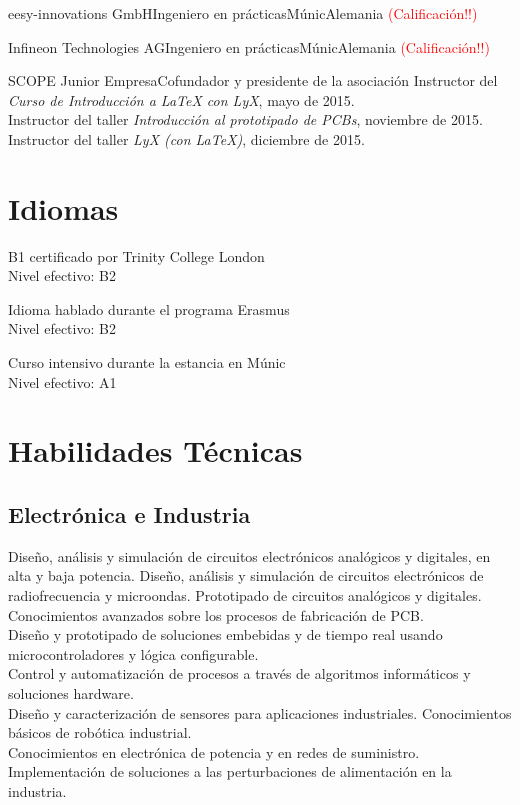 \documentclass[11pt,a4paper,sans,spanish]{moderncv}
\begin{document}
{eesy-innovations GmbH}{Ingeniero en prácticas}{Múnic}{Alemania}
{\textcolor{red}{(Calificación!!)}}

{Infineon Technologies AG}{Ingeniero en prácticas}{Múnic}{Alemania}
{\textcolor{red}{(Calificación!!)}}

{SCOPE Junior Empresa}{Cofundador y presidente de la asociación}{}{}
{Instructor del \emph{Curso de Introducción a LaTeX con LyX}, mayo de 2015.\\
Instructor del taller \emph{Introducción al prototipado de PCBs}, noviembre de 2015.\\
Instructor del taller \emph{LyX (con LaTeX)}, diciembre de 2015.}


\section{Idiomas}


{B1 certificado por Trinity College London\\Nivel efectivo: B2}

{Idioma hablado durante el programa Erasmus\\Nivel efectivo: B2}

{Curso intensivo durante la estancia en Múnic\\Nivel efectivo: A1} 

\section{Habilidades Técnicas}

\subsection{Electrónica e Industria}
Diseño, análisis y simulación de circuitos electrónicos analógicos y digitales, en alta y baja potencia. 
Diseño, análisis y simulación de circuitos electrónicos de radiofrecuencia y microondas.
Prototipado de circuitos analógicos y digitales. Conocimientos avanzados sobre los procesos de fabricación de PCB.
\protect\\[0.3em]
Diseño y prototipado de soluciones embebidas y de tiempo real usando microcontroladores y lógica configurable.
\protect\\[0.3em]
Control y automatización de procesos a través de algoritmos informáticos y soluciones hardware.
\protect\\[0.3em]
Diseño y caracterización de sensores para aplicaciones industriales. Conocimientos básicos de robótica industrial.
\protect\\[0.3em]
Conocimientos en electrónica de potencia y en redes de suministro. Implementación de soluciones a las perturbaciones de alimentación en la industria.
\end{document}
